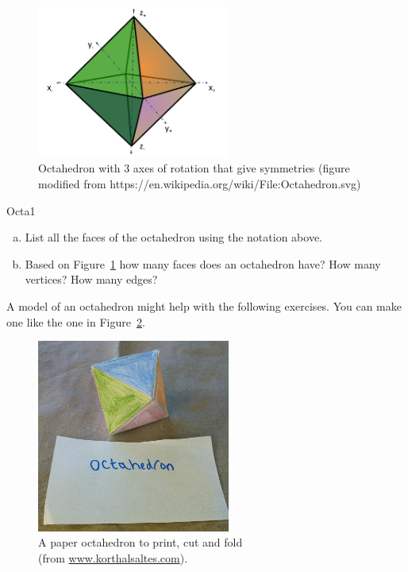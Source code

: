 \begin{figure}[ht]
\begin{center}
\includegraphics[width=2.5in]{images/AxesOfOctahedron.png}
\caption{Octahedron with 3 axes of rotation that give symmetries (figure modified from https://en.wikipedia.org/wiki/File:Octahedron.svg)
}\label{fig:OctaRot}
\end{center}
\end{figure}


\begin {exercise}{Octa1}
\begin {enumerate}[(a)]
\item List all the faces of the octahedron using the notation above.
\item Based on Figure~\ref{fig:OctaRot}  how many faces does an octahedron have? How many vertices?  How many edges?
\end{enumerate}
\end {exercise}

A model of an octahedron might help with the following exercises.  You can make one like the one in Figure~\ref{fig:OctaFold}.

\begin{figure}[ht]
\begin{center}
\includegraphics[width=2.5in]{images/OctahedronFold.png}
\caption[caption]{A paper octahedron to print, cut and fold
\\ \hspace{\textwidth}   (from \url{www.korthalsaltes.com}).}
 \label{fig:OctaFold}
\end{center}
\end{figure}

